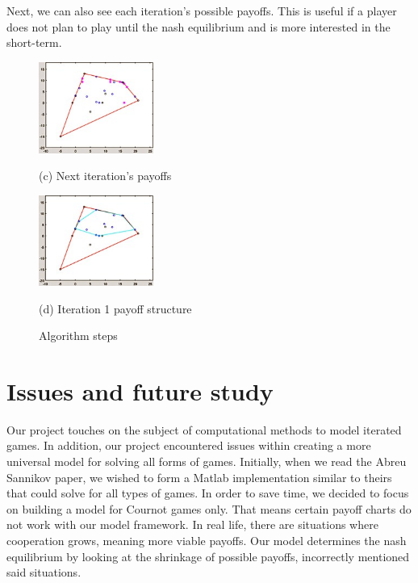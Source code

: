 \documentclass{article}
\begin{document}
Next, we can also see each iteration's possible payoffs. This is useful if a player does not plan to play until the nash equilibrium and is more interested in the short-term.

\begin{figure}[!ht]
%
\begin{minipage}[b]{.48\linewidth}
  \centering
  \centerline{\includegraphics[width=3.75cm]{newPoints}}
  \centerline{(c) Next iteration's payoffs}\medskip
\end{minipage}
\hfill
\begin{minipage}[b]{0.48\linewidth}
  \centering
  \centerline{\includegraphics[width=3.75cm]{newPolygon}}
  \centerline{(d) Iteration 1 payoff structure}\medskip
\end{minipage}
%
\caption{Algorithm steps }
\label{fig:res}
%
\end{figure}

\section{Issues and future study}

Our project touches on the subject of computational methods to model iterated games. In addition, our project encountered issues within creating a more universal model for solving all forms of games. Initially, when we read the Abreu Sannikov paper, we wished to form a Matlab implementation similar to theirs that could solve for all types of games. In order to save time, we decided to focus on building a model for Cournot games only. That means certain payoff charts do not work with our model framework. In real life, there are situations where cooperation grows, meaning more viable payoffs. Our model determines the nash equilibrium by looking at the shrinkage of possible payoffs, incorrectly mentioned said situations.
\end{document}
